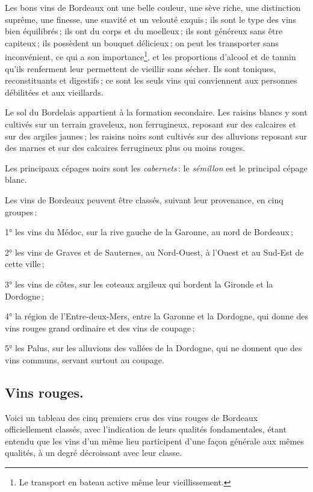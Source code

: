 Les bons vins de Bordeaux ont une belle couleur, une sève riche, une
distinction suprême, une finesse, une suavité et un velouté exquis ; ils sont
le type des vins bien équilibrés ; ils ont du corps et du moelleux ; ils sont
généreux sans être capiteux ; ils possèdent un bouquet délicieux ; on peut les
transporter sans inconvénient, ce qui a son importance\footnote{Le transport en
bateau active même leur vieillissement.}, et les proportions d'alcool et de
tannin qu'ils renferment leur permettent de vieillir sans sécher. Ils sont
toniques, reconstituants et digestifs ; ce sont les seuls vins qui conviennent
aux personnes débilitées et aux vieillards.

Le sol du Bordelais appartient à la formation secondaire. Les raisins blancs
y sont cultivés sur un terrain graveleux, non ferrugineux, reposant sur des
calcaires et sur des argiles jaunes ; les raisins noirs sont cultivés sur des
alluvions reposant sur des marnes et sur des calcaires ferrugineux plus ou
moins rouges.

Les principaux cépages noirs sont les \textit{cabernets} : le \textit{sémillon}
est le principal cépage blanc.

Les vins de Bordeaux peuvent être classés, suivant leur provenance, en cinq
groupes :

1° les vins du Médoc, sur la rive gauche de la Garonne, au nord de Bordeaux ;

2° les vins de Graves et de Sauternes, au Nord-Ouest, à l'Ouest et au Sud-Est
de cette ville ;

3° les vins de côtes, sur les coteaux argileux qui bordent la Gironde et la
Dordogne ;

4° la région de l'Entre-deux-Mers, entre la Garonne et la Dordogne, qui donne
des vins rouges grand ordinaire et des vins de coupage ;

5° les Palus, sur les alluvions des vallées de la Dordogne, qui ne donnent que
des vins communs, servant surtout au coupage.

\subsection*{\centering \small\sc Vins rouges.}

Voici un tableau des cinq premiers crus des vins rouges de Bordeaux
officiellement classés, avec l'indication de leurs qualités fondamentales,
étant entendu que les vins d’un même lieu participent d'une façon générale aux
mêmes qualités, à un degré décroissant avec leur classe.

